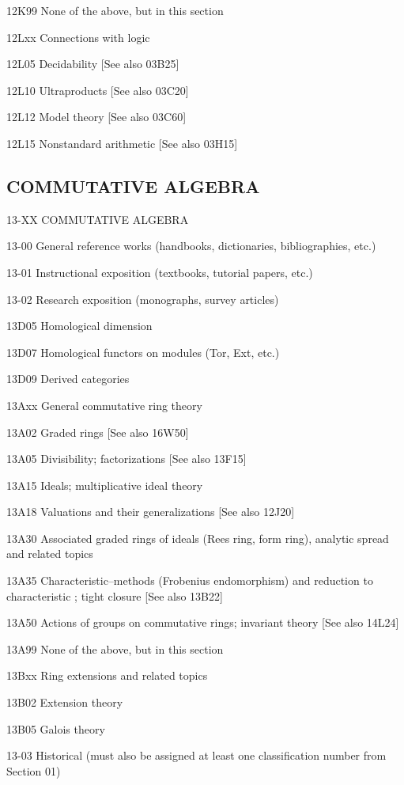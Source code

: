 \documentclass[12pt]{article}
\theoremstyle{plain}
\theoremstyle{definition}
\numberwithin{equation}{section}
\begin{document}
{12K99 None of the above, but in this section

12Lxx Connections with logic

12L05 Decidability [See also 03B25]

12L10 Ultraproducts [See also 03C20]

12L12 Model theory [See also 03C60]

12L15 Nonstandard arithmetic [See also 03H15]


\subsection{COMMUTATIVE ALGEBRA}

13-XX COMMUTATIVE ALGEBRA

13-00 General reference works (handbooks, dictionaries, bibliographies, etc.) 

13-01 Instructional exposition (textbooks, tutorial papers, etc.) 

13-02 Research exposition (monographs, survey articles)

13D05 Homological dimension

13D07 Homological functors on modules (Tor, Ext, etc.)

13D09 Derived categories

13Axx General commutative ring theory

13A02 Graded rings [See also 16W50]

13A05 Divisibility; factorizations [See also 13F15]

13A15 Ideals; multiplicative ideal theory

13A18 Valuations and their generalizations [See also 12J20]

13A30 Associated graded rings of ideals (Rees ring, form ring), analytic spread and related topics

13A35 Characteristic--methods (Frobenius endomorphism) and reduction to characteristic ; tight closure [See also 13B22]

13A50 Actions of groups on commutative rings; invariant theory [See also 14L24]

13A99 None of the above, but in this section

13Bxx Ring extensions and related topics

13B02 Extension theory

13B05 Galois theory

13-03 Historical (must also be assigned at least one classification number from Section 01)

}
\end{document}
